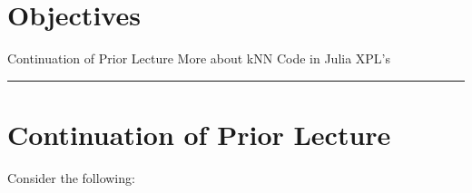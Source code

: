 
\section*{Objectives}
\begin{outline}
    \1 Continuation of Prior Lecture
    \1 More about kNN
    \1 Code in Julia
    \1 XPL's
\end{outline}

\rule[0.0051in]{\textwidth}{0.00025in}
\section{Continuation of Prior Lecture}

Consider the following:


